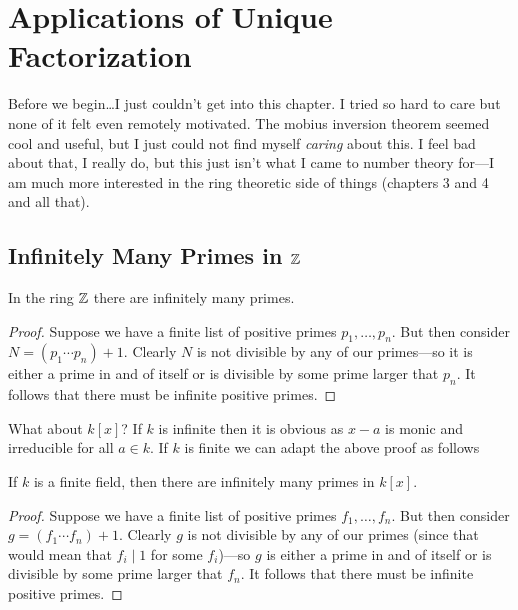 \chapter{Applications of Unique Factorization}\label{ch:Two}

Before we begin\dots I just couldn't get into this chapter. I tried so hard to
care but none of it felt even remotely motivated. The mobius inversion theorem
seemed cool and useful, but I just could not find myself \emph{caring} about
this. I feel bad about that, I really do, but this just isn't what I came to
number theory for---I am much more interested in the ring theoretic side of
things (chapters 3 and 4 and all that).

\section{Infinitely Many Primes in \(\mathbb{Z}\)}%
\label{sec:InfManyPrimes}

\begin{theorem}[Euclid]
  In the ring \(\mathbb{Z} \) there are infinitely many primes.
\end{theorem}

\begin{proof}
  Suppose we have a finite list of positive primes \(p_1, \dots ,p_n\). But
  then consider \(N= (p_1\cdots p_n)+1\). Clearly \(N\) is not divisible by any
  of our primes---so it is either a prime in and of itself or is divisible by
  some prime larger that \(p_n\). It follows that there must be infinite
  positive primes.
\end{proof}

What about \(k[x]\)? If \(k\) is infinite then it is obvious as \(x-a\) is monic
and irreducible for all \(a \in k\). If \(k\) is finite we can adapt the above
proof as follows

\begin{theorem}
  If \(k\) is a finite field, then there are infinitely many primes in \(k[x]\).
\end{theorem}

\begin{proof}
  Suppose we have a finite list of positive primes \(f_1, \dots ,f_n\). But
  then consider \(g= (f_1\cdots f_n)+1\). Clearly \(g\) is not divisible by any
  of our primes (since that would mean that \(f_i\mid 1\) for some \(f_i\))---so
  \(g\) is either a prime in and of itself or is divisible by some prime larger
  that \(f_n\). It follows that there must be infinite positive primes.
\end{proof}

